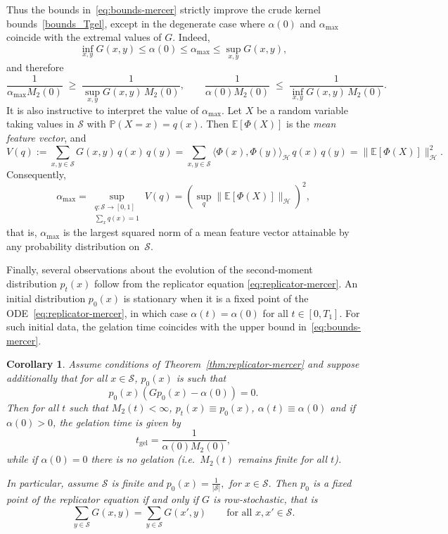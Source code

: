 \documentclass[12pt,twoside]{article}
\newtheorem{cor}[thm]{Corollary}
\begin{document}
Thus the bounds in~\eqref{eq:bounds-mercer} strictly improve the crude kernel
bounds~\eqref{bounds_Tgel}, except in the degenerate case where
$\alpha(0)$ and $\alpha_{\max}$ coincide with the extremal values of $G$.
Indeed,
\[
\inf_{x,y}G(x,y)\le \alpha(0)\le\alpha_{\max}\le\sup_{x,y}G(x,y),
\]
and therefore
\[
\frac{1}{\alpha_{\max}M_2(0)}
\;\ge\;
\frac{1}{\sup_{x,y}G(x,y)\,M_2(0)},
\qquad
\frac{1}{\alpha(0)M_2(0)}
\;\le\;
\frac{1}{\inf_{x,y}G(x,y)\,M_2(0)}.
\]
It is also instructive to interpret the value of $\alpha_{\max}$.  
Let $X$ be a random variable taking values in $\mathcal S$ with
$\mathbb P(X=x)=q(x)$.  
Then $\mathbb E[\Phi(X)]$ is the \emph{mean feature vector}, and
\[
V(q):= \sum_{x,y\in\mathcal S} G(x,y)\,q(x)\,q(y)
	=\sum_{x,y\in\mathcal S}\langle \Phi(x),\Phi(y)\rangle_{\mathcal H}\,q(x)\,q(y)
         =\bigl\|\mathbb E[\Phi(X)]\bigr\|_{\mathcal H}^2.
\]
Consequently,
\[
\alpha_{\max}=\sup_{\substack{q:\mathcal S\to[0,1]\\ \sum_x q(x)=1}}V(q)=
\left(
\sup_{q}
\bigl\|\mathbb E[\Phi(X)]\bigr\|_{\mathcal H}
\right)^2,
\]
that is, $\alpha_{\max}$ is the largest squared norm of a mean feature vector
attainable by any probability distribution on~$\mathcal S$.

Finally, several observations about the evolution of the second-moment
distribution $p_t(x)$ follow from the replicator equation
\eqref{eq:replicator-mercer}.  
An initial distribution $p_0(x)$ is stationary when it is a fixed
point of the ODE~\eqref{eq:replicator-mercer}, in which case
$\alpha(t)=\alpha(0)$ for all $t\in[0,T_1]$.  
For such initial data, the gelation time coincides with the upper bound
in~\eqref{eq:bounds-mercer}.


\begin{cor}\label{cor:fixed-point-gelation}
Assume conditions of Theorem~\ref{thm:replicator-mercer} and suppose additionally that for all $x\in\mathcal S$, $p_0(x)$ is such that
$$p_0(x)(Gp_0(x)-\alpha(0))=0.$$ Then for all $t$ such that $M_2(t)<\infty$, $p_t(x)\equiv p_0(x)$, $\alpha(t)\equiv\alpha(0)$ and if $\alpha(0)>0$, the gelation time is given  by
\[
t_{\mathrm{gel}}=\frac{1}{\alpha(0)M_2(0)},
\]
while if $\alpha(0)=0$ there is no gelation (i.e.\ $M_2(t)$ remains finite for all $t$).

In particular, assume $\mathcal S$ is finite and $p_0(x)=\frac{1}{|\mathcal S|},$ for $x\in\mathcal S.$ Then $p_0$ is a fixed point of the replicator equation if and only if $G$ is row‑stochastic, that is
\[
\sum_{y\in\mathcal S}G(x,y)=\sum_{y\in\mathcal S}G(x',y) \qquad\text{for all }x,x'\in\mathcal S.
\]
\end{cor}
\end{document}
